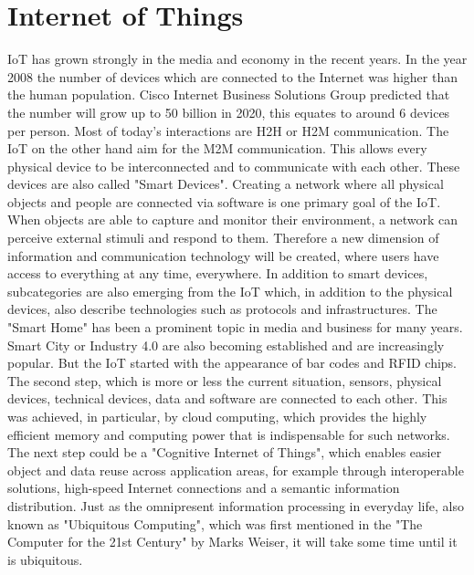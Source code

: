 \section{Internet of Things}
\ac{IoT} has grown strongly in the media and economy in the recent years.
In the year 2008 the number of devices which are connected to the Internet was higher than the human population.\autocite[cf.][p. 3]{Eva:2011}
Cisco Internet Business Solutions Group predicted that the number will grow up to 50 billion in 2020, this equates to around 6 devices per person.\autocite[cf.][p. 4]{Eva:2011}
Most of today's interactions are \ac{H2H} or \ac{H2M} communication.
The \ac{IoT} on the other hand aim for the \ac{M2M} communication.
This allows every physical device to be interconnected and to communicate with each other.
These devices are also called "Smart Devices".
Creating a network where all physical objects and people are connected via software is one primary goal of the \ac{IoT}.\autocite[cf.][p.206]{Rui:2015}\autocite[cf.][p.2]{Kra:2013}
When objects are able to capture and monitor their environment, a network can perceive external stimuli and respond to them.\autocite[cf.][p. 40]{Itu11}
Therefore a new dimension of information and communication technology will be created, where users have access to everything at any time, everywhere.
In addition to smart devices, subcategories are also emerging from the \ac{IoT} which, in addition to the physical devices, also describe technologies such as protocols and infrastructures.
The "Smart Home" has been a prominent topic in media and business for many years.
Smart City or Industry 4.0 are also becoming established and are increasingly popular.
But the \ac{IoT} started with the appearance of bar codes and \ac{RFID} chips.\autocite[cf.][p. 13]{Kra:2013}
The second step, which is more or less the current situation, sensors, physical devices, technical devices, data and software are connected to each other.\autocite[cf.][p. 13]{Kra:2013}
This was achieved, in particular, by cloud computing, which provides the highly efficient memory and computing power that is indispensable for such networks.\autocite[cf.][p. 206]{Rui:2015}
The next step could be a "Cognitive Internet of Things", which enables easier object and data reuse across application areas, for example through interoperable solutions, high-speed Internet connections and a semantic information distribution.\autocite[cf.][p. V]{Kra:2013}
Just as the omnipresent information processing in everyday life, also known as "Ubiquitous Computing", which was first mentioned in the "The Computer for the 21st Century"\autocite{Wei:1991} by Marks Weiser, it will take some time until it is ubiquitous.


